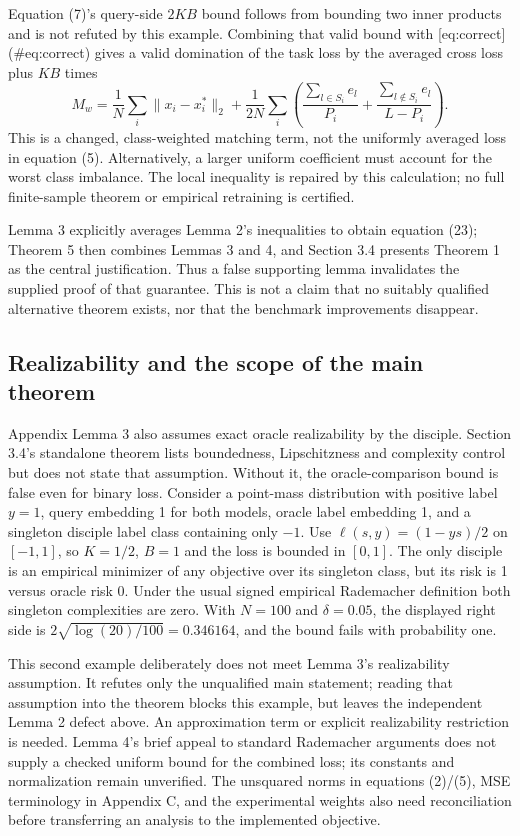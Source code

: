 \documentclass[10pt]{article}
\begin{document}
Equation (7)’s query-side \(2KB\) bound follows from bounding two inner products and is not refuted by this example. Combining that valid bound with [eq:correct] (\#eq:correct) gives a valid domination of the task loss by the averaged cross loss plus \(KB\) times \[M_w=\frac1N\sum_i\|x_i-x_i^*\|_2+
 \frac1{2N}\sum_i\left(\frac{\sum_{l\in S_i}e_l}{P_i}
 +\frac{\sum_{l\notin S_i}e_l}{L-P_i}\right).\] This is a changed, class-weighted matching term, not the uniformly averaged loss in equation (5). Alternatively, a larger uniform coefficient must account for the worst class imbalance. The local inequality is repaired by this calculation; no full finite-sample theorem or empirical retraining is certified.\par
Lemma 3 explicitly averages Lemma 2’s inequalities to obtain equation (23); Theorem 5 then combines Lemmas 3 and 4, and Section 3.4 presents Theorem 1 as the central justification. Thus a false supporting lemma invalidates the supplied proof of that guarantee. This is not a claim that no suitably qualified alternative theorem exists, nor that the benchmark improvements disappear.\par
\subsection*{Realizability and the scope of the main theorem}
Appendix Lemma 3 also assumes exact oracle realizability by the disciple. Section 3.4’s standalone theorem lists boundedness, Lipschitzness and complexity control but does not state that assumption. Without it, the oracle-comparison bound is false even for binary loss. Consider a point-mass distribution with positive label \(y=1\), query embedding 1 for both models, oracle label embedding 1, and a singleton disciple label class containing only \(-1\). Use \(\ell(s,y)=(1-ys)/2\) on \([-1,1]\), so \(K=1/2\), \(B=1\) and the loss is bounded in \([0,1]\). The only disciple is an empirical minimizer of any objective over its singleton class, but its risk is 1 versus oracle risk 0. Under the usual signed empirical Rademacher definition both singleton complexities are zero. With \(N=100\) and \(\delta=0.05\), the displayed right side is \(2\sqrt{\log(20)/100}=0.346164\), and the bound fails with probability one.\par
This second example deliberately does not meet Lemma 3’s realizability assumption. It refutes only the unqualified main statement; reading that assumption into the theorem blocks this example, but leaves the independent Lemma 2 defect above. An approximation term or explicit realizability restriction is needed. Lemma 4’s brief appeal to standard Rademacher arguments does not supply a checked uniform bound for the combined loss; its constants and normalization remain unverified. The unsquared norms in equations (2)/(5), MSE terminology in Appendix C, and the experimental weights also need reconciliation before transferring an analysis to the implemented objective.\par
\end{document}
